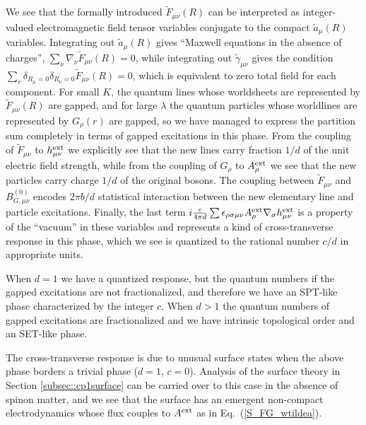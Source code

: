 \documentclass[prb,twocolumn]{revtex4-1}
\def\cG{{G}}
\def\Aext{A^{\rm ext}}
\def\hext{h^{\rm ext}}
\def\uu{B}
\begin{document}
We see that the formally introduced $\tilde{F}_{\mu\nu}(R)$ can be interpreted as integer-valued electromagnetic field tensor variables conjugate to the compact $\tilde{a}_\mu(R)$ variables.  Integrating out $\tilde{a}_\mu(R)$ gives ``Maxwell equations in the absence of charges'', $\sum_\nu \nabla_\nu \tilde{F}_{\mu\nu}(R) = 0$, while integrating out $\tilde{\gamma}_{\mu\nu}$ gives the condition $\sum_r \delta_{R_\mu = 0} \delta_{R_\nu = 0} \tilde{F}_{\mu\nu}(R) = 0$, which is equivalent to zero total field for each component.  For small $K$, the quantum lines whose worldsheets are represented by $\tilde{F}_{\mu\nu}(R)$ are gapped, and for large $\lambda$ the quantum particles whose worldlines are represented by $\cG_\rho(r)$ are gapped, so we have managed to express the partition sum completely in terms of gapped excitations in this phase.  From the coupling of $\tilde{F}_{\mu\nu}$ to $\hext_{\mu\nu}$ we explicitly see that the new lines carry fraction $1/d$ of the unit electric field strength, while from the coupling of $\cG_\rho$ to $\Aext_\rho$ we see that the new particles carry charge $1/d$ of the original bosons.  The coupling between $\tilde{F}_{\mu\nu}$ and $\uu_{G, \mu\nu}^{(0)}$ encodes $2\pi b/d$ statistical interaction between the new elementary line and particle excitations.  Finally, the last term $i \frac{c}{4\pi d} \sum \epsilon_{\rho\sigma\mu\nu} \Aext_\rho \nabla_\sigma \hext_{\mu\nu}$ is a property of the ``vacuum'' in these variables and represents a kind of cross-transverse response in this phase, which we see is quantized to the rational number $c/d$ in appropriate units.

When $d=1$ we have a quantized response, but the quantum numbers if the gapped excitations are not fractionalized, and therefore we have an SPT-like phase characterized by the integer $c$. When $d>1$ the quantum numbers of gapped excitations are fractionalized and we have intrinsic topological order and an SET-like phase.

The cross-transverse response is due to unusual surface states when the above phase borders a trivial phase ($d=1$, $c=0$). Analysis of the surface theory in Section \ref{subsec::cp1surface} can be carried over to this case in the absence of spinon matter, and we see that the surface has an emergent non-compact electrodynamics whose flux couples to $\Aext$ as in Eq.~(\ref{S_FG_wtildea}). 
\end{document}
